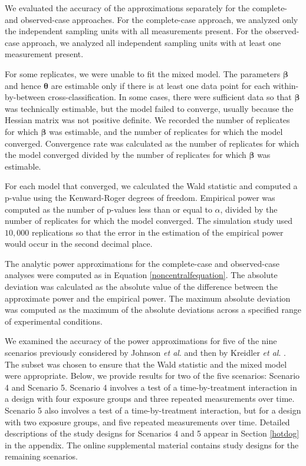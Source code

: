 \documentclass[11pt]{article}
\begin{document}
We evaluated the accuracy of the approximations separately for the complete- and observed-case approaches. For the complete-case approach, we analyzed only the independent sampling units with all measurements present. For the observed-case approach, we analyzed all independent sampling units with at least one measurement present. 

For some replicates, we were unable to fit the mixed model. The parameters $\boldsymbol{\beta}$ and hence $\boldsymbol{\theta}$ are estimable only if there is at least one data point for each within-by-between cross-classification. In some cases, there were sufficient data so that $\boldsymbol{\beta}$ was technically estimable, but the model failed to converge, usually because the Hessian matrix was not positive definite. We recorded the number of replicates for which $\boldsymbol{\beta}$ was estimable, and the number of replicates for which the model converged. Convergence rate was calculated as the number of replicates for which the model converged divided by the number of replicates for which $\boldsymbol{\beta}$ was estimable.

For each model that converged, we calculated the Wald statistic and computed a p-value using the Kenward-Roger \cite{kenward_improved_2009} degrees of freedom. Empirical power was computed as the number of p-values less than or equal to $\alpha$, divided by the number of replicates for which the model converged. The simulation study used $10,000$ replications so that the error in the estimation of the empirical power would occur in the second decimal place.

The analytic power approximations for the complete-case and observed-case analyses were computed as in Equation \ref{noncentralfequation}. The absolute deviation was calculated as the absolute value of the difference between the approximate power and the empirical power. The maximum absolute deviation was computed as the maximum of the absolute deviations across a specified range of experimental conditions.

We examined the accuracy of the power approximations for five of the nine scenarios previously considered by Johnson \textit{et al}. \cite{johnson_powerlib:_2009} and then by Kreidler \textit{et al}. \cite{kreidler_glimmpse:_2013}. The subset was chosen to ensure that the Wald statistic and the mixed model were appropriate. Below, we provide results for two of the five scenarios: Scenario 4 and Scenario 5. Scenario 4 involves a test of a time-by-treatment interaction in a design with four exposure groups and three repeated measurements over time. Scenario 5 also involves a test of a time-by-treatment interaction, but for a design with two exposure groups, and five repeated measurements over time. Detailed descriptions of the study designs for Scenarios 4 and 5 appear in Section \ref{hotdog} in the appendix. The online supplemental material contains study designs for the remaining scenarios. 
\end{document}
